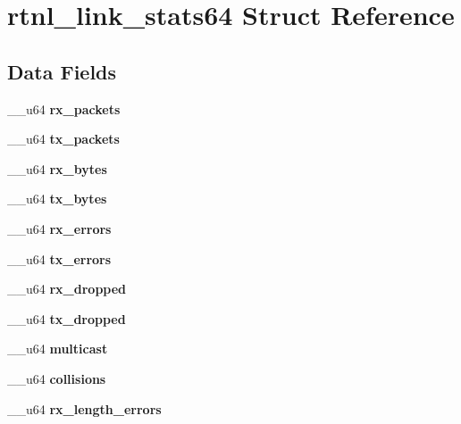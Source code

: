 \section{rtnl\-\_\-link\-\_\-stats64 \-Struct \-Reference}
\label{structrtnl__link__stats64}
\subsection*{\-Data \-Fields}
\begin{DoxyCompactItemize}
\item 
\-\_\-\-\_\-u64 {\bfseries rx\-\_\-packets}\label{structrtnl__link__stats64_ad086cddc7135058de5d1a7f02d4703ee}

\item 
\-\_\-\-\_\-u64 {\bfseries tx\-\_\-packets}\label{structrtnl__link__stats64_a5148ae783b755895ec949501bc0f4169}

\item 
\-\_\-\-\_\-u64 {\bfseries rx\-\_\-bytes}\label{structrtnl__link__stats64_a963b7e846ca9722ec542ab0734dc9dad}

\item 
\-\_\-\-\_\-u64 {\bfseries tx\-\_\-bytes}\label{structrtnl__link__stats64_afc1f10b39bb8e3c658e495473e5a2e74}

\item 
\-\_\-\-\_\-u64 {\bfseries rx\-\_\-errors}\label{structrtnl__link__stats64_a2241192c8e2e8a218feb2443eef15b80}

\item 
\-\_\-\-\_\-u64 {\bfseries tx\-\_\-errors}\label{structrtnl__link__stats64_acb44f50851f33051be3097bebd8fa32a}

\item 
\-\_\-\-\_\-u64 {\bfseries rx\-\_\-dropped}\label{structrtnl__link__stats64_a3eff138e9d856763947d1eb5ad317c15}

\item 
\-\_\-\-\_\-u64 {\bfseries tx\-\_\-dropped}\label{structrtnl__link__stats64_ac5dd29151916b6e81d41ee698bd8c8be}

\item 
\-\_\-\-\_\-u64 {\bfseries multicast}\label{structrtnl__link__stats64_a9e3a79ae234918a3f28795bbbddcc058}

\item 
\-\_\-\-\_\-u64 {\bfseries collisions}\label{structrtnl__link__stats64_a7eacf076dd6a152bf1ec2f1e939d6e15}

\item 
\-\_\-\-\_\-u64 {\bfseries rx\-\_\-length\-\_\-errors}\label{structrtnl__link__stats64_a6374d7f33380a72a3b6d4eb60c897d5a}


\end{DoxyCompactItemize}
